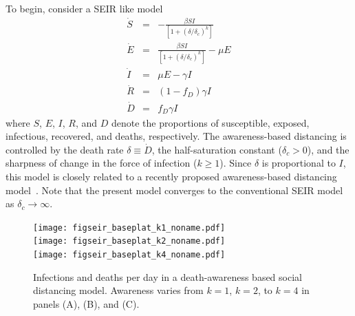 To begin, consider a SEIR like model
\begin{eqnarray}
\dot{S} &=& -\frac{\beta SI}{\left[1+\left(\delta/\delta_c\right)^{k}\right]}\\
\dot{E} &=& \frac{\beta SI}{\left[1+\left(\delta/\delta_c\right)^{k}\right]}-\mu E\\
\dot{I} &=& \mu E-\gamma I \\
\dot{R} &=& (1-f_D)\gamma I\\
\dot{D} &=& f_D\gamma I
\end{eqnarray}
where $S$, $E$, $I$, $R$, and $D$ denote the proportions of
susceptible, exposed, infectious, recovered, and deaths, respectively.
The awareness-based distancing is controlled by 
the death rate $\delta\equiv \dot{D}$,
the half-saturation constant ($\delta_c>0$), and
the sharpness of change in the force of infection ($k\geq 1$).
Since $\delta$ is proportional to $I$, this model is closely related to a recently proposed awareness-based distancing model~\citep{eksin2019systematic}.
Note that the present
model converges to the conventional SEIR model as $\delta_c\rightarrow \infty$.
\begin{figure}[t!]
\begin{center}
\texttt{[image: figseir\_baseplat\_k1\_noname.pdf]}\\
\texttt{[image: figseir\_baseplat\_k2\_noname.pdf]}\\
\texttt{[image: figseir\_baseplat\_k4\_noname.pdf]}
\caption{Infections and deaths per day in a death-awareness based
social distancing model. Awareness varies from $k=1$, $k=2$, to $k=4$ 
in panels (A), (B), and (C).
\label{fig.ID_day}}
\end{center}
\end{figure}

